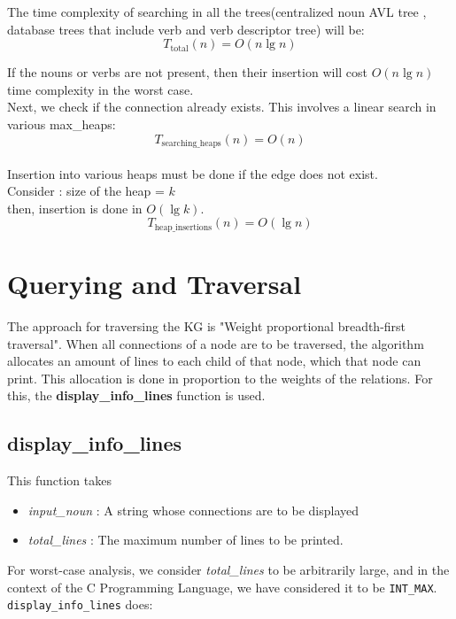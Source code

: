 \documentclass[conference]{IEEEtran}
\begin{document}

The time complexity of searching in all the trees(centralized noun AVL tree , database trees that include verb and verb descriptor tree) will be:
\begin{equation}
	T_{\text{total}}(n) = O(n \lg n)
\end{equation}

If the nouns or verbs are not present, then their insertion  will cost $O(n \lg n)$ time complexity in the worst case.
\\
Next, we check if the connection already exists. This involves a linear search in various max\_heaps:
\begin{equation}
	T_{\text{searching\_heaps}}(n) = O(n)
\end{equation}
\\
Insertion into various heaps must be done if the edge does not exist. \\Consider : size of the heap = $k$
\\then, insertion is done in $O(\lg k)$.
\\
\begin{equation}
	T_{\text{heap\_insertions}}(n) = O(\lg n)
\end{equation}



\section{Querying and Traversal}

The approach for traversing the KG is "Weight proportional breadth-first traversal". When all connections of a node are to be traversed, the algorithm allocates an amount of lines to each child of that node, which that node can print. This allocation is done in proportion to the weights of the relations. For this, the \textbf{display\_info\_lines} function is used.



\subsection{\textbf{display\_info\_lines}}

This function takes
\begin{itemize}
\item \textit{input\_noun} : A string whose connections are to be displayed
\item \textit{total\_lines} : The maximum number of lines to be printed. 
\end{itemize}
For worst-case analysis, we consider \textit{total\_lines} to be arbitrarily large, and in the context of the C Programming Language, we have considered it to be \texttt{INT\_MAX}.
\\\texttt{display\_info\_lines} does:
\end{document}

